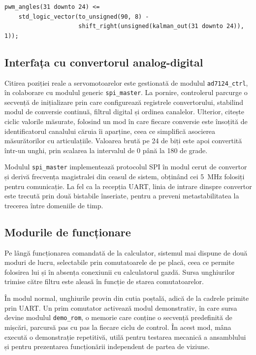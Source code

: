 \begin{lstlisting}[caption={Remaparea canalului degetului mare, inversat și scalat.},label={lst:remap}]
pwm_angles(31 downto 24) <=
    std_logic_vector(to_unsigned(90, 8) -
                     shift_right(unsigned(kalman_out(31 downto 24)), 1));
\end{lstlisting}

\subsection{Interfața cu convertorul analog-digital}

Citirea poziției reale a servomotoarelor este gestionată de modulul
\texttt{ad7124\_ctrl}, în colaborare cu modulul generic \texttt{spi\_master}. La
pornire, controlerul parcurge o secvență de inițializare prin care configurează
registrele convertorului, stabilind modul de conversie continuă, filtrul digital și
ordinea canalelor. Ulterior, citește ciclic valorile măsurate, folosind un mod în
care fiecare conversie este însoțită de identificatorul canalului căruia îi aparține,
ceea ce simplifică asocierea măsurătorilor cu articulațiile. Valoarea brută pe 24 de
biți este apoi convertită într-un unghi, prin scalarea la intervalul de 0 până la 180
de grade.

Modulul \texttt{spi\_master} implementează protocolul SPI în modul cerut de convertor
și derivă frecvența magistralei din ceasul de sistem, obținând cei 5~MHz folosiți
pentru comunicație. La fel ca la recepția UART, linia de intrare dinspre convertor
este trecută prin două bistabile înseriate, pentru a preveni metastabilitatea la
trecerea între domeniile de timp.

\subsection{Modurile de funcționare}

Pe lângă funcționarea comandată de la calculator, sistemul mai dispune de două moduri
de lucru, selectabile prin comutatoarele de pe placă, ceea ce permite folosirea lui și
în absența conexiunii cu calculatorul gazdă. Sursa unghiurilor trimise către filtru
este aleasă în funcție de starea comutatoarelor.

În modul normal, unghiurile provin din cutia poștală, adică de la cadrele primite prin
UART. Un prim comutator activează modul demonstrativ, în care sursa devine modulul
\texttt{demo\_rom}, o memorie care conține o secvență predefinită de mișcări, parcursă
pas cu pas la fiecare ciclu de control. În acest mod, mâna execută o demonstrație
repetitivă, utilă pentru testarea mecanică a ansamblului și pentru prezentarea
funcționării independent de partea de viziune.

